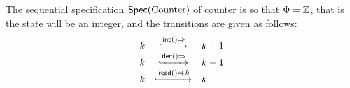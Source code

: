 \begin{example}
\label{definition:sequential specification of counter}
The sequential specification $\mathsf{Spec}(\text{Counter})$ of counter is so
that $\Phi = \mathbb{Z}$, that is the state will be an integer,
and the transitions are given as follows:
\[
  \begin{array}[rcl]{rcl}
    k & \specarrow{\alabellong[\mathsf{inc}]{}{}} & k+1\\
    k & \specarrow{\alabellong[\mathsf{dec}]{}{}} & k-1\\
    k & \specarrow{\alabellong[\mathsf{read}]{}{k}} & k
  \end{array}
\]
\end{example}


